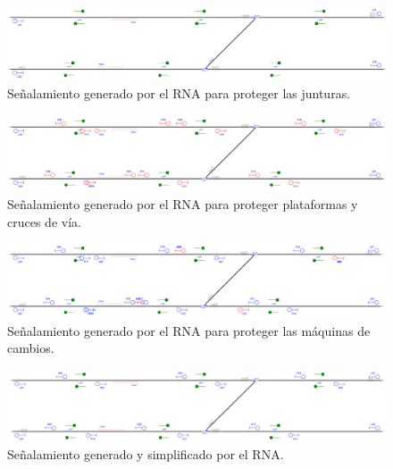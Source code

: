     \begin{figure}[h]
        \centering
        \includegraphics[width=1\textwidth]{resultados-obtenidos/ejemplo8/images/8_step2.png}
        \centering\caption{Señalamiento generado por el RNA para proteger las junturas.}
    \end{figure}

    \begin{figure}[h]
        \centering
        \includegraphics[width=1\textwidth]{resultados-obtenidos/ejemplo8/images/8_step3.png}
        \centering\caption{Señalamiento generado por el RNA para proteger plataformas y cruces de vía.}
    \end{figure}

    \begin{figure}[h]
        \centering
        \includegraphics[width=1\textwidth]{resultados-obtenidos/ejemplo8/images/8_step4.png}
        \centering\caption{Señalamiento generado por el RNA para proteger las máquinas de cambios.}
    \end{figure}

    \begin{figure}[h]
        \centering
        \includegraphics[width=1\textwidth]{resultados-obtenidos/ejemplo8/images/8_RNA.png}
        \centering\caption{Señalamiento generado y simplificado por el RNA.}
    \end{figure}

    
    
    
    